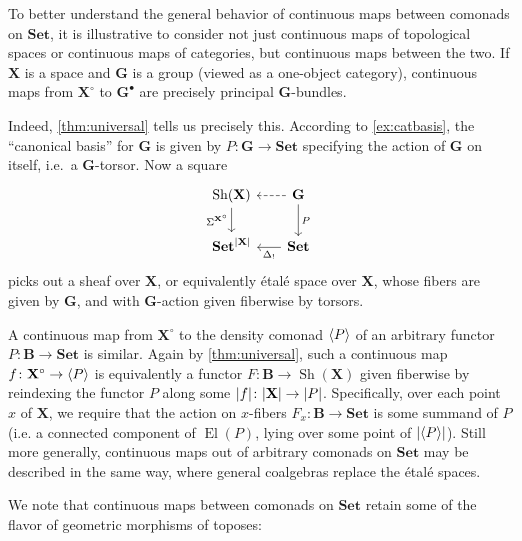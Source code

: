 \documentclass[11pt, oneside, article]{memoir}
\theoremstyle{plain}
\theoremstyle{definition}
\theoremstyle{remark}
\newenvironment{example}
{\renewcommand\qedsymbol{$\lrcorner$}%
  \pushQED{\qed}\myexample}
{\popQED\endmyexample}
\DeclareMathOperator{\Sh}{Sh}
\DeclareMathOperator{\El}{El}
\DeclarePairedDelimiter{\gen}{\langle}{\rangle}
\DeclarePairedDelimiter{\abs}{\lvert}{\rvert}
\newcommand{\bang}{\mathrm{!}}
\newcommand{\namedcat}[1]{\mathbf{#1}}
\newcommand{\cat}[1]{\mathbf{#1}}
\newcommand{\spa}[1]{\mathbf{#1}}
\newcommand{\Set}{\namedcat{Set}}
\newcommand{\pts}[1]{{\abs{#1}}}
\newcommand{\carr}{\Sigma}
\newcommand{\slicer}{\Delta_\bang}
\newcommand{\car}[1]{\carr^{#1}}
\newcommand{\ph}[1]{#1}
\newcommand{\bB}{\cat{B}}
\newcommand{\bG}{\cat{G}}
\newcommand{\pP}{\ph{P}}
\newcommand{\cP}{\gen{\pP}}
\newcommand{\tX}{\spa{X}}
\newcommand{\cX}{\toptocmd{\tX}}
\newcommand{\cattocmd}[1]{{{#1}^\bullet}}
\newcommand{\toptocmd}[1]{{{#1}^\circ}}
\begin{document}
\begin{example}
  To better understand the general behavior of continuous maps between
  comonads on $\Set$, it is illustrative to consider not just
  continuous maps of topological spaces or continuous maps of
  categories, but continuous maps between the two. If $\tX$ is a space
  and $\bG$ is a group (viewed as a one-object category), continuous
  maps from $\cX$ to $\cattocmd{\bG}$ are precisely principal
  $\bG$-bundles.

  Indeed, \cref{thm:universal} tells us precisely this. According to
  \cref{ex:catbasis}, the ``canonical basis'' for $\bG$ is given by
  $\pP \colon \bG \to \Set$ specifying the action of $\bG$ on itself,
  i.e.\ a $\bG$-torsor. Now a square
  \[
    \begin{tikzcd}[column sep=17.5]
      \Sh(\tX) & \bG \\
      {\Set^{\pts{\tX}}} & {\Set} \arrow["\car{\cX}"',
      from=1-1, to=2-1] \arrow[dashed, from=1-2, to=1-1]
      \arrow["\pP", from=1-2, to=2-2]
      \arrow["{\slicer}", from=2-2, to=2-1]
    \end{tikzcd}
  \]
  picks out a sheaf over $\tX$, or equivalently \'etal\'e space over
  $\tX$, whose fibers are given by $\bG$, and with $\bG$-action given
  fiberwise by torsors.

  A continuous map from $\cX$ to the density comonad $\cP$ of an
  arbitrary functor $\pP \colon \bB \to \Set$ is similar. Again by
  \cref{thm:universal}, such a continuous map $f \colon \cX \to \cP$
  is equivalently a functor $F \colon \bB \to \Sh(\tX)$ given
  fiberwise by reindexing the functor $\pP$ along some
  $\pts{f} \colon \pts{\tX} \to \pts{\pP}$. Specifically, over each
  point $x$ of $\tX$, we require that the action on $x$-fibers
  $F_x \colon \bB \to \Set$ is some summand of $\pP$ (i.e. a connected
  component of $\El(\pP)$, lying over some point of
  $\pts{\cP}$). Still more generally, continuous maps out of arbitrary
  comonads on $\Set$ may be described in the same way, where general
  coalgebras replace the \'etal\'e spaces.
\end{example}

We note that continuous maps between comonads on $\Set$ retain some of
the flavor of geometric morphisms of toposes:
\end{document}
